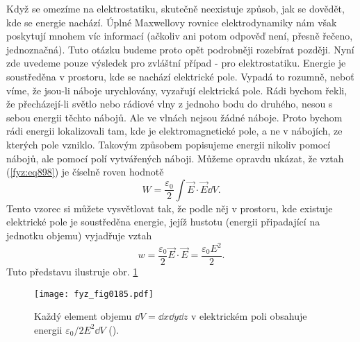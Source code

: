     Když se omezíme na elektrostatiku, skutečně neexistuje způsob, jak se dovědět, kde se energie
    nachází. Úplné Maxwellovy rovnice elektrodynamiky nám však poskytují mnohem víc informací
    (ačkoliv ani potom odpověď není, přesně řečeno, jednoznačná). Tuto otázku budeme proto opět
    podrobněji rozebírat později. Nyní zde uvedeme pouze výsledek pro zvláštní případ - pro
    elektrostatiku. Energie je soustředěna v prostoru, kde se nachází elektrické pole. Vypadá to
    rozumně, neboť víme, že jsou-li náboje urychlovány, vyzařují elektrická pole. Rádi bychom řekli,
    že přecházejí-li světlo nebo rádiové vlny z jednoho bodu do druhého, nesou s sebou energii
    těchto nábojů. Ale ve vlnách nejsou žádné náboje. Proto bychom rádi energii lokalizovali tam,
    kde je elektromagnetické pole, a ne v nábojích, ze kterých pole vzniklo. Takovým způsobem
    popisujeme energii nikoliv pomocí nábojů, ale pomocí polí vytvářených náboji. Můžeme opravdu
    ukázat, že vztah (\ref{fyz:eq898}) je číselně roven hodnotě
    \begin{equation}\label{fyz:eq900}
      W=\dfrac{\varepsilon_0}{2}\int\vec{E}\cdot\vec{E}\dd{V}.
    \end{equation}
    Tento vzorec si můžete vysvětlovat tak, že podle něj v prostoru, kde existuje elektrické pole je
    soustředěna energie, jejíž hustotu (energii připadající na jednotku objemu) vyjadřuje vztah
    \begin{equation}\label{fyz:eq901}
      w=\dfrac{\varepsilon_0}{2}\vec{E}\cdot\vec{E}=\dfrac{\varepsilon_0E^2}{2}.
    \end{equation}
    Tuto představu ilustruje obr. \ref{fyz:fig0185}

    \begin{figure}[ht!]  %
      \centering
      \texttt{[image: fyz\_fig0185.pdf]}
      \caption{Každý element objemu \(\dd{V} = \dd{x}\dd{y}\dd{z}\) v elektrickém  poli obsahuje
      energii \(\varepsilon_0/2E^2\dd{V}\) (\cite[s.~154]{Feynman02}).}
      \label{fyz:fig0185}
    \end{figure}

